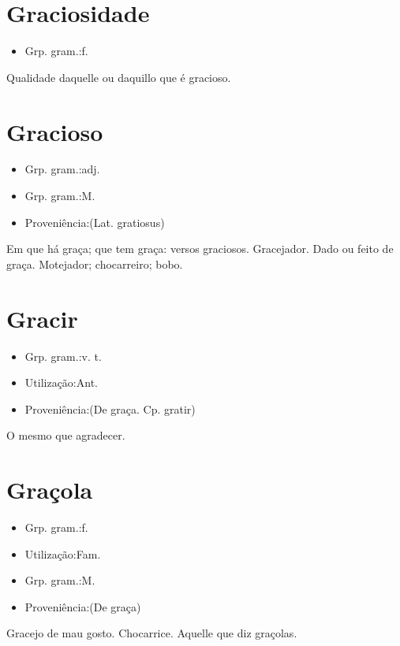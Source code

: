\section{Graciosidade}
\begin{itemize}
\item {Grp. gram.:f.}
\end{itemize}
Qualidade daquelle ou daquillo que é gracioso.
\section{Gracioso}
\begin{itemize}
\item {Grp. gram.:adj.}
\end{itemize}
\begin{itemize}
\item {Grp. gram.:M.}
\end{itemize}
\begin{itemize}
\item {Proveniência:(Lat. \textunderscore gratiosus\textunderscore )}
\end{itemize}
Em que há graça; que tem graça: \textunderscore versos graciosos\textunderscore .
Gracejador.
Dado ou feito de graça.
Motejador; chocarreiro; bobo.
\section{Gracir}
\begin{itemize}
\item {Grp. gram.:v. t.}
\end{itemize}
\begin{itemize}
\item {Utilização:Ant.}
\end{itemize}
\begin{itemize}
\item {Proveniência:(De \textunderscore graça\textunderscore . Cp. \textunderscore gratir\textunderscore )}
\end{itemize}
O mesmo que \textunderscore agradecer\textunderscore .
\section{Graçola}
\begin{itemize}
\item {Grp. gram.:f.}
\end{itemize}
\begin{itemize}
\item {Utilização:Fam.}
\end{itemize}
\begin{itemize}
\item {Grp. gram.:M.}
\end{itemize}
\begin{itemize}
\item {Proveniência:(De \textunderscore graça\textunderscore )}
\end{itemize}
Gracejo de mau gosto.
Chocarrice.
Aquelle que diz graçolas.
